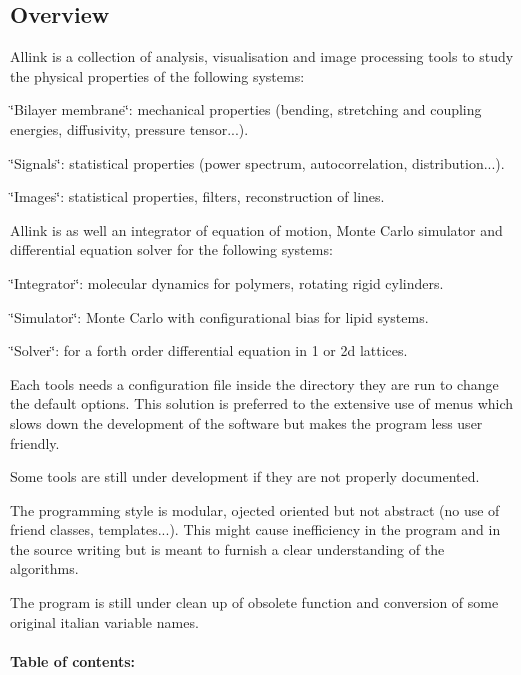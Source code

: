 \hypertarget{index_Overview_section}{}\subsection{\-Overview}\label{index_Overview_section}
\-Allink is a collection of analysis, visualisation and image processing tools to study the physical properties of the following systems\-: 
\begin{DoxyItemize}
\item \char`\"{}\-Bilayer membrane\char`\"{}\-: mechanical properties (bending, stretching and coupling energies, diffusivity, pressure tensor...). 
\item \char`\"{}\-Signals\char`\"{}\-: statistical properties (power spectrum, autocorrelation, distribution...). 
\item \char`\"{}\-Images\char`\"{}\-: statistical properties, filters, reconstruction of lines. 
\end{DoxyItemize}\-Allink is as well an integrator of equation of motion, \-Monte \-Carlo simulator and differential equation solver for the following systems\-: 
\begin{DoxyItemize}
\item \char`\"{}\-Integrator\char`\"{}\-: molecular dynamics for polymers, rotating rigid cylinders. 
\item \char`\"{}\-Simulator\char`\"{}\-: \-Monte \-Carlo with configurational bias for lipid systems. 
\item \char`\"{}\-Solver\char`\"{}\-: for a forth order differential equation in 1 or 2d lattices. 
\end{DoxyItemize}\-Each tools needs a configuration file inside the directory they are run to change the default options. \-This solution is preferred to the extensive use of menus which slows down the development of the software but makes the program less user friendly.\par
 \-Some tools are still under development if they are not properly documented. \par
 \-The programming style is modular, ojected oriented but not abstract (no use of friend classes, templates...). \-This might cause inefficiency in the program and in the source writing but is meant to furnish a clear understanding of the algorithms.\par
 \-The program is still under clean up of obsolete function and conversion of some original italian variable names. \paragraph*{\-Table of contents\-: }


